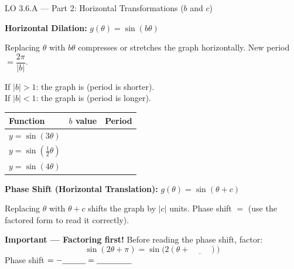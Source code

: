 \documentclass[10pt]{article}
\begin{document}
\begin{notesbox}{LO 3.6.A --- Part 2: Horizontal Transformations ($b$ and $c$)}

\textbf{Horizontal Dilation:} $g(\theta) = \sin(b\theta)$

Replacing $\theta$ with $b\theta$ compresses or stretches the graph horizontally.
New period $= \dfrac{2\pi}{|b|}$.

\vspace{4pt}
If $|b| > 1$: the graph is \underline{\hspace{2.5cm}} (period is shorter). \\
If $|b| < 1$: the graph is \underline{\hspace{2.5cm}} (period is longer).

\vspace{6pt}
\begin{tabular}{|l|c|c|}
\hline
\textbf{Function} & \textbf{$b$ value} & \textbf{Period} \\
\hline
$y = \sin(3\theta)$ & & \\
\hline
$y = \sin\!\left(\tfrac{1}{2}\theta\right)$ & & \\
\hline
$y = \sin(4\theta)$ & & \\
\hline
\end{tabular}

\vspace{8pt}
\textbf{Phase Shift (Horizontal Translation):} $g(\theta) = \sin(\theta + c)$

Replacing $\theta$ with $\theta + c$ shifts the graph \underline{\hspace{1cm}}
by $|c|$ units.
Phase shift $= $ \underline{\hspace{1.5cm}} (use the factored form to read it correctly).

\vspace{4pt}
\textbf{Important --- Factoring first!} Before reading the phase shift, factor:
$$\sin(2\theta + \pi) = \sin\!\bigl(2(\theta + \underline{\hspace{1cm}})\bigr)$$
Phase shift $= -\underline{\hspace{1cm}} = \underline{\hspace{1.5cm}}$

\end{notesbox}

\vspace{0.08in}
\end{document}

